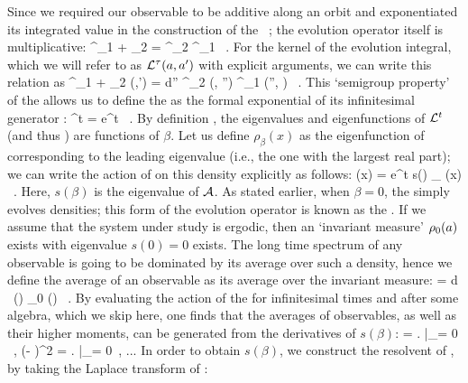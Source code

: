 \documentclass[aip,cha,
reprint,
secnumarabic,
nofootinbib, tightenlines,
nobibnotes, showkeys, showpacs,
superscriptaddress,
]{revtex4-1}
\begin{document}
{Since we required our observable to be additive along an orbit and
exponentiated its integrated value in the construction of the \evOper\
; the evolution operator itself is multiplicative:
\beq
    \Lop^{\zeit_1 + \zeit_2} = \Lop^{\zeit_2} \Lop^{\zeit_1} \, .
    \label{eq-SemiGroup}
\eeq
For the kernel of the evolution integral, which we will refer to as
${\cal L}^{\tau} (a, a')$ with explicit arguments, we can write this 
relation as
\beq
	\Lop^{\zeit_1 + \zeit_2} (\ssp,\ssp') =
    \int d\ssp'' \Lop^{\zeit_2} (\ssp, \ssp'')
                   \Lop^{\zeit_1} (\ssp'', \ssp) \, .
	\label{eq-SemiGroupKernel}
\eeq
This `semigroup property'  of the {\evOper} 
allows us to define the {\evOper} as the formal exponential of its 
infinitesimal generator \Aop :
\beq
	\Lop^t = e^{\Aop t} \, .
	\label{eq-EvOpExp}
\eeq
By definition , the eigenvalues and eigenfunctions 
of ${\cal L}^t$ (and thus \Aop ) are functions of $\beta$. Let us 
define $\rho_{\beta} (x)$ as the eigenfunction of  
corresponding to the leading eigenvalue (i.e., the one with the 
largest real part); we can write the action of \refeq{e-EvOper} on 
this density explicitly as follows:
\beq
     (x) = e^{t s(\beta )} \rho_{\beta} (x)
    \, .
    \label{eq-EigenvalueRel}
\eeq
Here, $s(\beta)$ is the eigenvalue of ${\cal A}$. As stated earlier, 
when $\beta = 0$, the {\evOper} simply evolves densities; this 
form of the evolution operator is known as the {\FPoper}. If we 
assume that the system under study is ergodic, then an `invariant 
measure' $\rho_0(a)$ exists with eigenvalue $s(0) = 0$ exists. 
The long time spectrum of any observable is going to be dominated 
by its average over such a density, hence we define the average of 
an observable as its average over the invariant measure:
\beq
    \langle \obser \rangle = \int d \ssp \, \obser(\ssp) \rho_0 (\ssp) \, .
    \label{e-obserAvg}
\eeq
By evaluating the action of the {\evOper}  for 
infinitesimal times and after some algebra, which we skip here, 
one finds that the averages of observables, as well as their 
higher moments, can be generated from the derivatives of $s(\beta)$:
\beq
    \langle \obser \rangle =
        \left.  \right|_{\beta = 0} \, , \quad
    \langle (\obser - \langle \obser \rangle )^2 \rangle =
        \left.  \right|_{\beta = 0} \,, ...
    \label{eq-moments}
\eeq
In order to obtain $s(\beta)$, we construct the resolvent of \Aop , 
by taking the Laplace transform of \refeq{eq-EvOpExp}:
}
\end{document}
